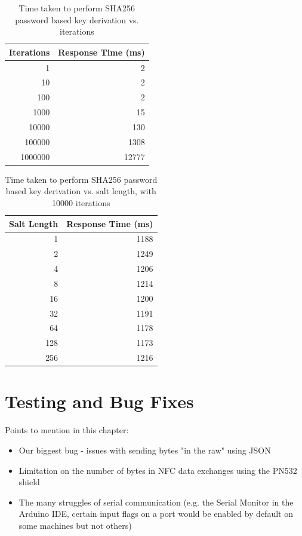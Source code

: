 \documentclass[12pt]{report}
\begin{document}

\begin{table}[!h]
	\centering
	\begin{tabular}{| r | r |}
		\hline
		Iterations & Response Time (ms) \\ \hline
		1 & 2 \\ \hline
		10 & 2 \\ \hline
		100 & 2 \\ \hline
		1000 & 15 \\ \hline
		10000 & 130 \\ \hline
		100000 & 1308 \\ \hline
		1000000 & 12777 \\ \hline
	\end{tabular}
	\caption{Time taken to perform SHA256 password based key derivation vs. iterations}
	\label{tab:sha256-performance}
\end{table}

\begin{table}[!h]
	\centering
	\begin{tabular}{| r | r |}
		\hline
		Salt Length & Response Time (ms) \\ \hline
		1 & 1188 \\ \hline
		2 & 1249 \\ \hline
		4 & 1206 \\ \hline
		8 & 1214 \\ \hline
		16 & 1200 \\ \hline
		32 & 1191 \\ \hline
		64 & 1178 \\ \hline
		128 & 1173 \\ \hline
		256 & 1216 \\ \hline
	\end{tabular}
	\caption{Time taken to perform SHA256 password based key derivation vs. salt length, with 10000 iterations}
	\label{tab:sha256-salt-performance}
\end{table}


\chapter{Testing and Bug Fixes} \label{testing-and-bug-fixes}

Points to mention in this chapter:
\begin{itemize}
    \item Our biggest bug - issues with sending bytes "in the raw" using JSON
    \item Limitation on the number of bytes in NFC data exchanges using the PN532 shield
    \item The many struggles of serial communication (e.g. the Serial Monitor in the Arduino IDE, certain input flags 
    on a port would be enabled by default on some machines but not others)
\end{itemize}
\end{document}
